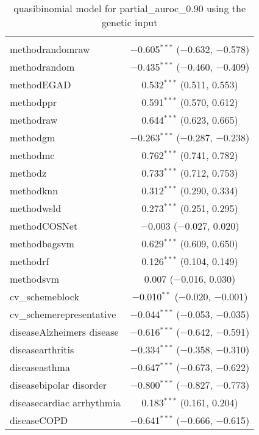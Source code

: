 
\begin{table}[!htbp] \centering 
  \caption{quasibinomial model for partial_auroc_0.90 using the genetic input} 
  \label{} 
\begin{tabular}{@{\extracolsep{5pt}}lc} 
\\[-1.8ex]\hline 
\hline \\[-1.8ex] 
 methodrandomraw & $-$0.605$^{***}$ ($-$0.632, $-$0.578) \\ 
  methodrandom & $-$0.435$^{***}$ ($-$0.460, $-$0.409) \\ 
  methodEGAD & 0.532$^{***}$ (0.511, 0.553) \\ 
  methodppr & 0.591$^{***}$ (0.570, 0.612) \\ 
  methodraw & 0.644$^{***}$ (0.623, 0.665) \\ 
  methodgm & $-$0.263$^{***}$ ($-$0.287, $-$0.238) \\ 
  methodmc & 0.762$^{***}$ (0.741, 0.782) \\ 
  methodz & 0.733$^{***}$ (0.712, 0.753) \\ 
  methodknn & 0.312$^{***}$ (0.290, 0.334) \\ 
  methodwsld & 0.273$^{***}$ (0.251, 0.295) \\ 
  methodCOSNet & $-$0.003 ($-$0.027, 0.020) \\ 
  methodbagsvm & 0.629$^{***}$ (0.609, 0.650) \\ 
  methodrf & 0.126$^{***}$ (0.104, 0.149) \\ 
  methodsvm & 0.007 ($-$0.016, 0.030) \\ 
  cv\_schemeblock & $-$0.010$^{**}$ ($-$0.020, $-$0.001) \\ 
  cv\_schemerepresentative & $-$0.044$^{***}$ ($-$0.053, $-$0.035) \\ 
  diseaseAlzheimers disease & $-$0.616$^{***}$ ($-$0.642, $-$0.591) \\ 
  diseasearthritis & $-$0.334$^{***}$ ($-$0.358, $-$0.310) \\ 
  diseaseasthma & $-$0.647$^{***}$ ($-$0.673, $-$0.622) \\ 
  diseasebipolar disorder & $-$0.800$^{***}$ ($-$0.827, $-$0.773) \\ 
  diseasecardiac arrhythmia & 0.183$^{***}$ (0.161, 0.204) \\ 
  diseaseCOPD & $-$0.641$^{***}$ ($-$0.666, $-$0.615) \\ 

\end{tabular}
\end{table}
